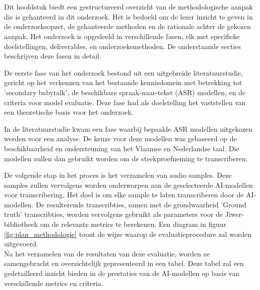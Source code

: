 
\chapter{}%
\label{ch:methodologie}

Dit hoofdstuk biedt een gestructureerd overzicht van de methodologische aanpak die is gehanteerd in dit onderzoek. Het is bedoeld om de lezer inzicht te geven in de onderzoeksopzet, de gehanteerde methoden en de rationale achter de gekozen aanpak. Het onderzoek is opgedeeld in verschillende fasen, elk met specifieke doelstellingen, deliverables, en onderzoeksmethoden. De onderstaande secties beschrijven deze fasen in detail.

De eerste fase van het onderzoek bestond uit een uitgebreide literatuurstudie, gericht op het verkennen van het bestaande kennisdomein met betrekking tot 'secondary babytalk', de beschikbare spraak-naar-tekst (ASR) modellen, en de criteria voor model evaluatie. Deze fase had als doelstelling het vaststellen van een theoretische basis voor het onderzoek.


In de literatuurstudie kwam een fase waarbij bepaalde ASR modellen uitgekozen werden voor een analyse. De keuze voor deze modellen was gebaseerd op de beschikbaarheid en ondersteuning van het Vlaamse en Nederlandse taal. Die modellen zullen dan gebruikt worden om de steekproefneming te transcriberen.



De volgende stap in het proces is het verzamelen van audio samples. Deze samples zullen vervolgens worden onderworpen aan de geselecteerde AI-modellen voor transcribering. Het doel is om elke sample te laten transcriberen door de AI-modellen. 
De resulterende transcribties, samen met de grondwaarheid 'Ground truth' transcribties, worden vervolgens gebruikt als parameters voor de Jiwer-bibliotheek om de relevante metrics te berekenen. Een diagram in figuur \ref{fig:plan_methodologie} toont de wijze waarop de evaluatieprocedure zal worden uitgevoerd.
\\

Na het verzamelen van de resultaten van deze evaluatie, worden ze samengebracht en overzichtelijk gepresenteerd in een tabel. Deze tabel zal een gedetailleerd inzicht bieden in de prestaties van de AI-modellen op basis van verschillende metrics en criteria. 

